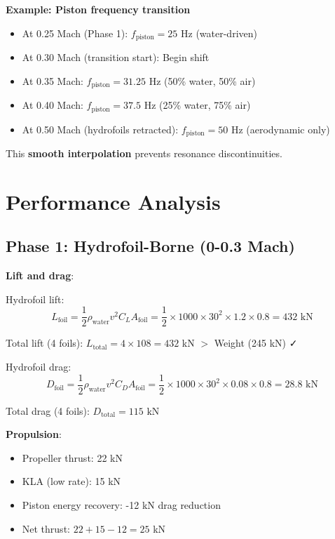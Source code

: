 \documentclass[12pt,a4paper]{article}
\begin{document}
\textbf{Example: Piston frequency transition}

\begin{itemize}
\item At 0.25 Mach (Phase 1): $f_{\text{piston}} = 25$ Hz (water-driven)
\item At 0.30 Mach (transition start): Begin shift
\item At 0.35 Mach: $f_{\text{piston}} = 31.25$ Hz (50\% water, 50\% air)
\item At 0.40 Mach: $f_{\text{piston}} = 37.5$ Hz (25\% water, 75\% air)
\item At 0.50 Mach (hydrofoils retracted): $f_{\text{piston}} = 50$ Hz (aerodynamic only)
\end{itemize}

This \textbf{smooth interpolation} prevents resonance discontinuities.

\section{Performance Analysis}

\subsection{Phase 1: Hydrofoil-Borne (0-0.3 Mach)}

\textbf{Lift and drag}:

Hydrofoil lift:
\begin{equation}
L_{\text{foil}} = \frac{1}{2} \rho_{\text{water}} v^2 C_L A_{\text{foil}} = \frac{1}{2} \times 1000 \times 30^2 \times 1.2 \times 0.8 = 432 \text{ kN}
\end{equation}

Total lift (4 foils): $L_{\text{total}} = 4 \times 108 = 432$ kN $>$ Weight (245 kN) ✓

Hydrofoil drag:
\begin{equation}
D_{\text{foil}} = \frac{1}{2} \rho_{\text{water}} v^2 C_D A_{\text{foil}} = \frac{1}{2} \times 1000 \times 30^2 \times 0.08 \times 0.8 = 28.8 \text{ kN}
\end{equation}

Total drag (4 foils): $D_{\text{total}} = 115 \text{ kN}$

\textbf{Propulsion}:
\begin{itemize}
\item Propeller thrust: 22 kN
\item KLA (low rate): 15 kN
\item Piston energy recovery: -12 kN drag reduction
\item Net thrust: $22 + 15 - 12 = 25$ kN
\end{itemize}
\end{document}
